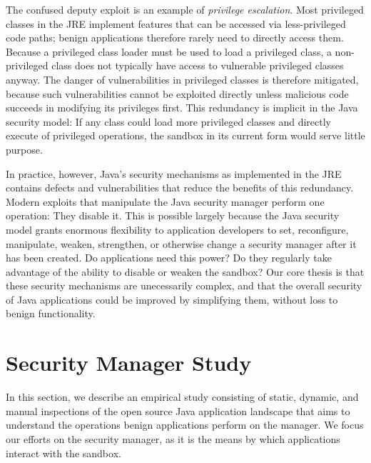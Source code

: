 \documentclass{sig-alternate}
\begin{document}
The confused deputy exploit is an example of \emph{privilege escalation}.  Most
privileged classes in the JRE implement features that can be accessed via
less-privileged code paths; benign applications therefore rarely need to
directly access them. 
Because a privileged class loader must be used to load a privileged class, 
a non-privileged class does not typically have access to vulnerable
privileged classes anyway. The danger of vulnerabilities in privileged
classes is therefore mitigated, because such vulnerabilities cannot be exploited
directly unless malicious code succeeds in modifying its privileges first. 
This redundancy is implicit in the Java security model: If any class
could load more privileged classes and directly execute
of privileged operations, the sandbox in its current form would serve
little purpose. 

In practice, however, Java's security mechanisms as implemented
in the JRE contains defects and vulnerabilities that reduce the benefits of
this redundancy.  
Modern exploits that manipulate the Java security manager perform one
operation: They disable it.  This is possible largely because the Java security model
grants enormous flexibility to application developers to
set, reconfigure, manipulate, weaken, strengthen, or otherwise change a security
manager after it has been created.
Do applications need this power?  Do they regularly take advantage of the
ability to disable or weaken the sandbox? %
Our core thesis is that these security mechanisms are unecessarily
complex, and that the overall security of Java applications could be improved by
simplifying them, without loss to benign functionality.

\section{Security Manager Study}\label{sec:Security-Manager-Study}

In this section, we describe an empirical study consisting of static,
dynamic, and manual inspections of the open source Java application landscape
that aims to understand the operations benign applications perform on the
manager. We focus our efforts on the security manager, as it is the
means by which applications interact with the sandbox.
\end{document}
